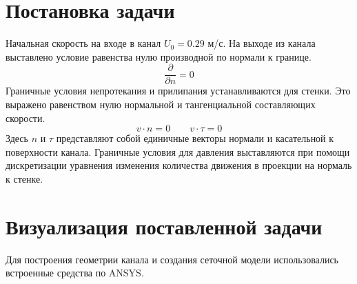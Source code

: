 \section{Постановка задачи}
	Начальная скорость на входе в канал $U_0 = 0.29$ м/с.
	На выходе из канала выставлено условие равенства нулю производной по нормали к границе.
	\begin{equation}
		\frac{\partial}{\partial n} = 0
	\end{equation}
	Граничные условия непротекания и прилипания устанавливаются для стенки. Это выражено равенством нулю нормальной и тангенциальной составляющих скорости.
	\begin{equation}
		v \cdot n = 0 \qquad v \cdot \tau = 0
	\end{equation}
	Здесь $n$ и $\tau$ представляют собой единичные векторы нормали и касательной к поверхности канала. Граничные условия для давления выставляются при помощи дискретизации уравнения изменения количества движения в проекции на нормаль к стенке.

\section{Визуализация поставленной задачи}
	Для построения геометрии канала и создания сеточной модели использовались встроенные средства по ANSYS.
